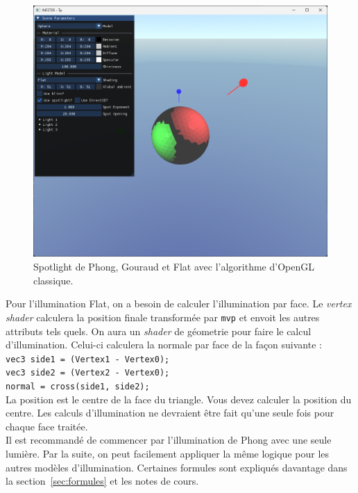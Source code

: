 \documentclass{article}[letterpaper, 11pt]
\begin{document}
\begin{figure}[ht]
\begin{minipage}[c]{.33\linewidth}
		\centering
		\includegraphics[scale = 0.16]{image_11.png}
  \end{minipage}
		 \caption{ \centering Spotlight de Phong, Gouraud et Flat avec l'algorithme d'OpenGL classique.}
\end{figure}

Pour l'illumination Flat, on a besoin de calculer l'illumination par face. Le \textit{vertex shader} calculera la position finale transformée par \texttt{mvp} et envoit les autres attributs tels quels. On aura un \textit{shader} de géometrie pour faire le calcul d'illumination. Celui-ci calculera la normale par face de la façon suivante :\\
\texttt{vec3 side1 = (Vertex1 - Vertex0);}\\
\texttt{vec3 side2 = (Vertex2 - Vertex0);}\\
\texttt{normal = cross(side1, side2);}\vspace*{11pt}
\\\newpage
La position est le centre de la face du triangle. Vous devez calculer la position du centre. Les calculs d'illumination ne devraient être fait qu'une seule fois pour chaque face traitée.\vspace*{11pt}
\\
Il est recommandé de commencer par l'illumination de Phong avec une seule lumière. Par la suite, on peut facilement appliquer la même logique pour les autres modèles d'illumination. Certaines formules sont expliqués davantage dans la section~\ref{sec:formules} et les notes de cours.
\end{document}
